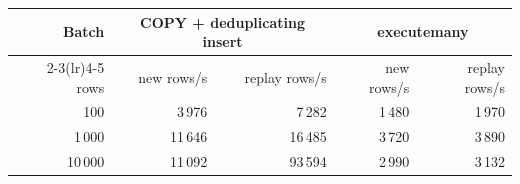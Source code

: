 \begin{tabular}{rrrrr}
\toprule
Batch & \multicolumn{2}{c}{COPY + deduplicating insert} & \multicolumn{2}{c}{executemany} \\
\cmidrule(lr){2-3}\cmidrule(lr){4-5}
rows & new rows/s & replay rows/s & new rows/s & replay rows/s \\
\midrule
100 & 3\,976 & 7\,282 & 1\,480 & 1\,970 \\
1\,000 & 11\,646 & 16\,485 & 3\,720 & 3\,890 \\
10\,000 & 11\,092 & 93\,594 & 2\,990 & 3\,132 \\
\bottomrule
\end{tabular}

